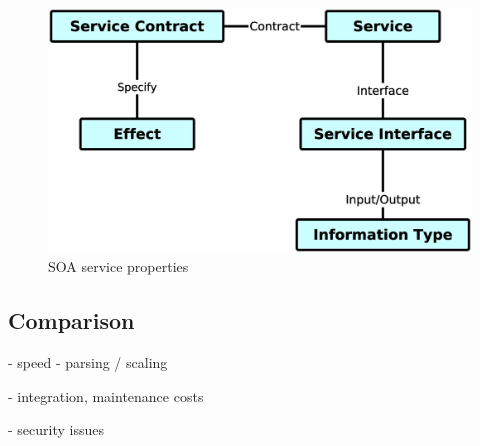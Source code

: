 \begin{figure}[!h]
\centering
\includegraphics[scale=.2]{img/soa_property.eps}
\caption{SOA service properties}
\label{fig:cm}
\end{figure}


\subsection{Comparison}


- speed - parsing / scaling

- integration, maintenance costs

- security issues

